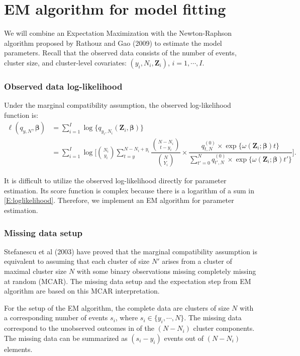 \documentclass[reqno]{amsart}
\begin{document}
\section{EM algorithm for model fitting}
We will combine an Expectation Maximization with the Newton-Raphson algorithm proposed by Rathouz and Gao (2009) to estimate the model parameters. Recall that the observed data consists of the number of events, cluster size, and cluster-level covariates: $(y_i, N_i, \boldsymbol{Z}_i)$, $i=1,\cdots,I$. 

\subsubsection{Observed data log-likelihood}
Under the marginal compatibility assumption, the observed log-likelihood function is:
\begin{equation}\label{E:loglikelihood}
\begin{split}
    \ell (q_{y,N}, \boldsymbol{\beta}) &= \sum_{i=1}^I \log \{ q_{y_i,N_i} (\boldsymbol{Z}_i, \boldsymbol{\beta}) \} \\
    &= \sum_{i=1}^I \log \bigg[ \binom{N_i}{y_i} \sum_{t=y}^{N-N_i+y_i} \dfrac{\binom{N-N_i}{t-y_i}}{\binom{N}{Y_i}} \times \dfrac{q_{t,N}^{(0)} \times \exp \{ \omega(\boldsymbol{Z}_i; \boldsymbol{\beta}) t \}} {\sum_{t'=0}^{N} q_{t',N}^{(0)} \times \exp \{ \omega(\boldsymbol{Z}_i; \boldsymbol{\beta}) t' \}}  \bigg].
\end{split}
\end{equation}

It is difficult to utilize the observed log-likelihood directly for parameter estimation. Its score function is complex because there is a logarithm of a sum in \eqref{E:loglikelihood}. Therefore, we implement an EM algorithm for parameter estimation.



\subsubsection{Missing data setup}
Stefanescu et al (2003) have proved that the marginal compatibility assumption is equivalent to assuming that each cluster of size $N'$ arises from a cluster of maximal cluster size $N$ with some binary observations missing completely missing at random (MCAR). The missing data setup and the expectation step from EM algorithm are based on this MCAR interpretation. 

For the setup of the EM algorithm, the complete data are clusters of size $N$ with a corresponding number of events $s_i$, where $s_i \in \{y_i, \cdots, N \}$. The missing data correspond to the unobserved outcomes in of the $(N - N_i)$ cluster components. The missing data can be summarized as $(s_i - y_i)$ events out of $(N - N_i)$ elements.
\end{document}
